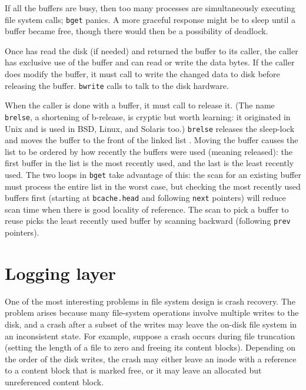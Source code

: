 If all the buffers are busy, then too many processes are
simultaneously executing file system calls;
\lstinline{bget}
panics.
A more graceful response might be to sleep until a buffer became free,
though there would then be a possibility of deadlock.

Once
has read the disk (if needed) and returned the
buffer to its caller, the caller has
exclusive use of the buffer and can read or write the data bytes.
If the caller does modify the buffer, it must call
to write the changed data to disk before releasing the buffer.
\lstinline{bwrite}
calls
to talk to the disk hardware.

When the caller is done with a buffer,
it must call
to release it. 
(The name
\lstinline{brelse},
a shortening of
b-release,
is cryptic but worth learning:
it originated in Unix and is used in BSD, Linux, and Solaris too.)
\lstinline{brelse}
releases the sleep-lock and
moves the buffer
to the front of the linked list
.
Moving the buffer causes the
list to be ordered by how recently the buffers were used (meaning released):
the first buffer in the list is the most recently used,
and the last is the least recently used.
The two loops in
\lstinline{bget}
take advantage of this:
the scan for an existing buffer must process the entire list
in the worst case, but checking the most recently used buffers
first (starting at
\lstinline{bcache.head}
and following
\lstinline{next}
pointers) will reduce scan time when there is good locality of reference.
The scan to pick a buffer to reuse picks the least recently used
buffer by scanning backward
(following 
\lstinline{prev}
pointers).
\section{Logging layer}

One of the most interesting problems in file system design is crash
recovery. The problem arises because many file-system operations
involve multiple writes to the disk, and a crash after a subset of the
writes may leave the on-disk file system in an inconsistent state. For
example, suppose a crash occurs during file truncation (setting
the length of a file to zero and freeing its content blocks).
Depending on the order of the disk writes, the crash 
may either leave an inode with a reference
to a content block that is marked free,
or it may leave an allocated but unreferenced content block.


